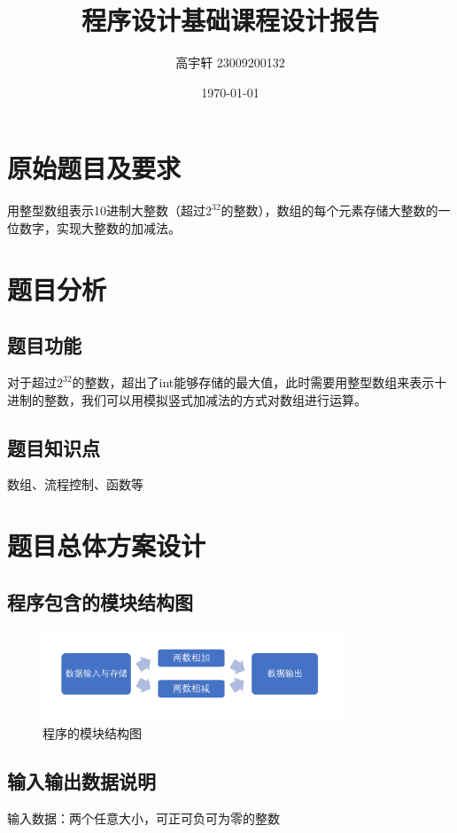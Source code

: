 \documentclass{ctexart}
\title{\vspace{-2cm}\textbf{程序设计基础课程设计报告} \\ \fontsize{12}{14}{---高精度计算}}
\author{高宇轩 23009200132}
\date{\today}
\begin{document}
    
    \maketitle
    
    \section{原始题目及要求}
    用整型数组表示10进制大整数（超过$2^{32}$的整数），数组的每个元素存储大整数的一位数字，实现大整数的加减法。
    
    \section{题目分析}
        
    \subsection{题目功能}
    对于超过$2^{32}$的整数，超出了int能够存储的最大值，此时需要用整型数组来表示十进制的整数，我们可以用模拟竖式加减法的方式对数组进行运算。
    \subsection{题目知识点}
    数组、流程控制、函数等
    
    \section{题目总体方案设计}
    
    \subsection{程序包含的模块结构图}
    \begin{figure}[h] %
        \centering
        \includegraphics[width=0.8\textwidth]{parts.png}
        \caption{程序的模块结构图}

    \end{figure}
    \subsection{输入输出数据说明}
    输入数据：两个任意大小，可正可负可为零的整数
    
\end{document}
